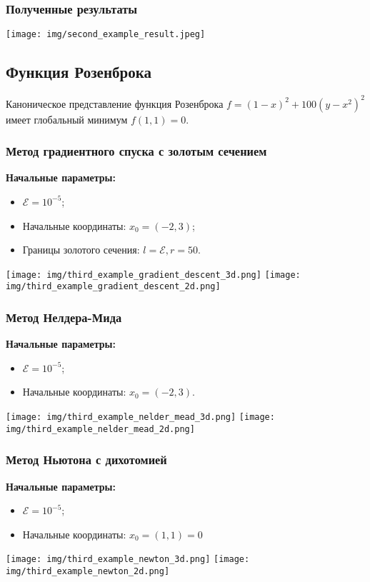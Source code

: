\documentclass{article}
\begin{document}
\subsubsection*{Полученные результаты}
\texttt{[image: img/second\_example\_result.jpeg]}

\subsection*{Функция Розенброка}
Каноническое представление функция Розенброка $f = (1 - x)^2 + 100(y - x^2)^2$ имеет глобальный минимум $f(1, 1) = 0$.
\subsubsection*{Метод градиентного спуска с золотым сечением}
\textbf{Начальные параметры:}
\begin{itemize}
    \item $\mathcal{E} = 10^{-5}$;
    \item Начальные координаты: $x_0 = (-2, 3)$;
    \item Границы золотого сечения: $l = \mathcal{E}, r = 50$.
\end{itemize}
\begin{center}
    \texttt{[image: img/third\_example\_gradient\_descent\_3d.png]}
    \texttt{[image: img/third\_example\_gradient\_descent\_2d.png]}
    \label{fig:enter-label}
\end{center}
\subsubsection*{Метод Нелдера-Мида}
\textbf{Начальные параметры:}
\begin{itemize}
    \item $\mathcal{E} = 10^{-5}$;
    \item Начальные координаты: $x_0 = (-2, 3)$.
\end{itemize}
\begin{center}
    \texttt{[image: img/third\_example\_nelder\_mead\_3d.png]}
    \texttt{[image: img/third\_example\_nelder\_mead\_2d.png]}
    \label{fig:enter-label}
\end{center}
\subsubsection*{Метод Ньютона с дихотомией}
\textbf{Начальные параметры:}
\begin{itemize}
    \item $\mathcal{E} = 10^{-5}$;
    \item Начальные координаты: $x_0 = (1, 1) = 0$
\end{itemize}
\begin{center}
    \texttt{[image: img/third\_example\_newton\_3d.png]}
    \texttt{[image: img/third\_example\_newton\_2d.png]}
    \label{fig:enter-label}
\end{center}
\end{document}
